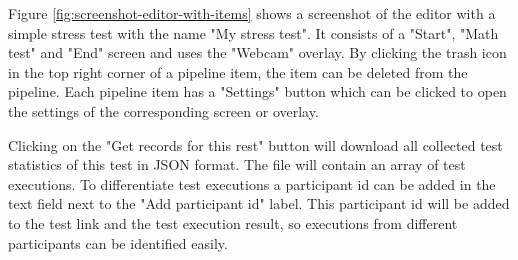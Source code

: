 Figure \ref{fig:screenshot-editor-with-items} shows a screenshot of the editor with a simple stress test with the name "My stress test".
It consists of a "Start", "Math test" and "End" screen and uses the "Webcam" overlay.
By clicking the trash icon in the top right corner of a pipeline item, the item can be deleted from the pipeline.
Each pipeline item has a "Settings" button which can be clicked to open the settings of the corresponding screen or overlay.

Clicking on the "Get records for this rest" button will download all collected test statistics of this test in JSON format.
The file will contain an array of test executions.
To differentiate test executions a participant id can be added in the text field next to the "Add participant id" label.
This participant id will be added to the test link and the test execution result, so executions from different participants can be identified easily.
